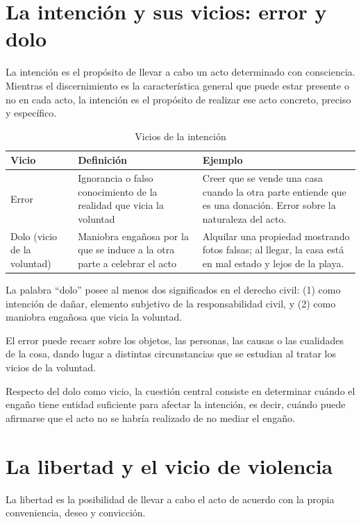 \documentclass[12pt,oneside]{book}
\begin{document}
\section{La intención y sus vicios: error y dolo}

La intención es el propósito de llevar a cabo un acto determinado con consciencia. Mientras el discernimiento es la característica general que puede estar presente o no en cada acto, la intención es el propósito de realizar ese acto concreto, preciso y específico.

\begin{table}[H]
\centering
\caption{Vicios de la intención}
\begin{tabularx}{\textwidth}{l X X}
\toprule
\textbf{Vicio} & \textbf{Definición} & \textbf{Ejemplo} \\
\midrule
Error & Ignorancia o falso conocimiento de la realidad que vicia la voluntad & Creer que se vende una casa cuando la otra parte entiende que es una donación. Error sobre la naturaleza del acto. \\
Dolo (vicio de la voluntad) & Maniobra engañosa por la que se induce a la otra parte a celebrar el acto & Alquilar una propiedad mostrando fotos falsas; al llegar, la casa está en mal estado y lejos de la playa. \\
\bottomrule
\end{tabularx}
\end{table}

La palabra ``dolo'' posee al menos dos significados en el derecho civil: (1) como intención de dañar, elemento subjetivo de la responsabilidad civil, y (2) como maniobra engañosa que vicia la voluntad.

El error puede recaer sobre los objetos, las personas, las causas o las cualidades de la cosa, dando lugar a distintas circunstancias que se estudian al tratar los vicios de la voluntad.

Respecto del dolo como vicio, la cuestión central consiste en determinar cuándo el engaño tiene entidad suficiente para afectar la intención, es decir, cuándo puede afirmarse que el acto no se habría realizado de no mediar el engaño.

\section{La libertad y el vicio de violencia}

La libertad es la posibilidad de llevar a cabo el acto de acuerdo con la propia conveniencia, deseo y convicción.
\end{document}

